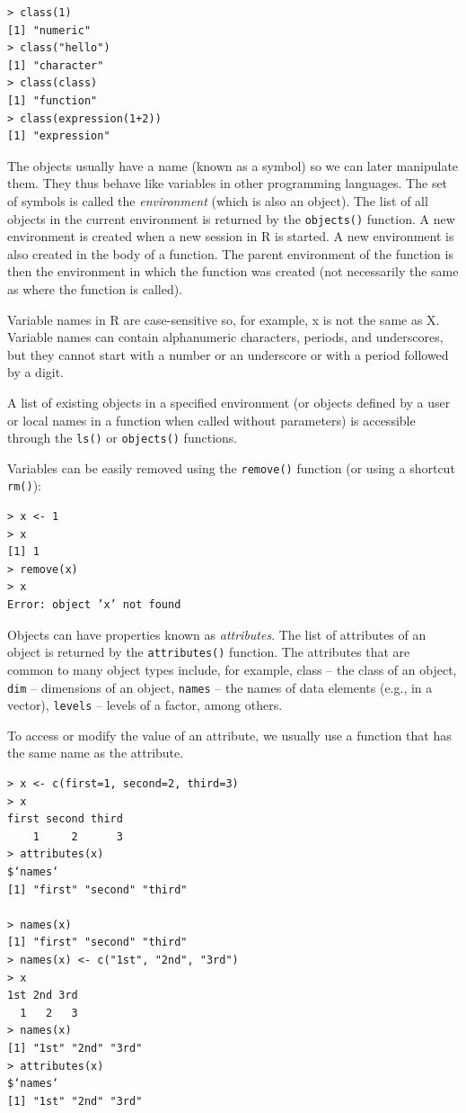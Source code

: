 \begin{verbatim}
> class(1)
[1] "numeric"
> class("hello")
[1] "character"
> class(class)
[1] "function"
> class(expression(1+2))
[1] "expression"
\end{verbatim}

The objects usually have a name (known as a symbol) so we can later manipulate them. They thus behave like variables in other programming languages. The set of symbols is called the \textit{environment} (which is also an object). The list of all
objects in the current environment is returned by the \texttt{objects()} function. A new
environment is created when a new session in R is started. A new environment
is also created in the body of a function. The parent environment of the function
is then the environment in which the function was created (not necessarily the
same as where the function is called).

Variable names in R are case-sensitive so, for example, x is not the same as X.
Variable names can contain alphanumeric characters, periods, and underscores,
but they cannot start with a number or an underscore or with a period followed
by a digit.

A list of existing objects in a specified environment (or objects defined by a
user or local names in a function when called without parameters) is accessible
through the \texttt{ls()} or \texttt{objects()} functions.

Variables can be easily removed using the \texttt{remove()} function (or using a
shortcut \texttt{rm()}):

\begin{verbatim}
> x <- 1
> x
[1] 1
> remove(x)
> x
Error: object ’x’ not found
\end{verbatim}

Objects can have properties known as \textit{attributes}. The list of attributes of an
object is returned by the \texttt{attributes()} function. The attributes that are common to many object types include, for example, class – the class of an object,
\texttt{dim} – dimensions of an object, \texttt{names} – the names of data elements (e.g., in a
vector), \texttt{levels} – levels of a factor, among others.

To access or modify the value of an attribute, we usually use a function that
has the same name as the attribute.

\begin{verbatim}
> x <- c(first=1, second=2, third=3)
> x
first second third
    1     2      3
> attributes(x)
$‘names‘
[1] "first" "second" "third"

> names(x)
[1] "first" "second" "third"
> names(x) <- c("1st", "2nd", "3rd")
> x
1st 2nd 3rd
  1   2   3
> names(x)
[1] "1st" "2nd" "3rd"
> attributes(x)
$‘names‘
[1] "1st" "2nd" "3rd"
\end{verbatim}


